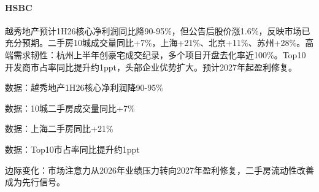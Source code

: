 \documentclass[11pt]{ctexart}
\begin{document}
\paragraph{HSBC} 越秀地产预计1H26核心净利润同比降90-95\%，但公告后股价涨1.6\%，反映市场已充分预期。二手房10城成交量同比+7\%，上海+21\%、北京+11\%、苏州+28\%。高端需求韧性：杭州上半年创豪宅成交纪录，多个项目开盘去化率近100\%。Top10开发商市占率同比提升约1ppt，头部企业优势扩大。预计2027年起盈利修复。
{\small\color{refgray}数据：越秀地产1H26核心净利润降90-95\%\par}
{\small\color{refgray}数据：10城二手房成交量同比+7\%\par}
{\small\color{refgray}数据：上海二手房同比+21\%\par}
{\small\color{refgray}数据：Top10市占率同比提升约1ppt\par}
{\small\color{refgray}边际变化：市场注意力从2026年业绩压力转向2027年盈利修复，二手房流动性改善成为先行信号。\par}
\end{document}
